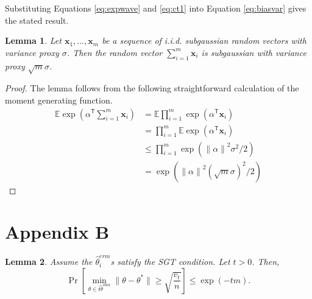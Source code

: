 \documentclass[twoside]{article}
\newtheorem{lemma}{Lemma}
\DeclareMathOperator*{\tr}{tr}
\newcommand{\Wowa}{{\hat \Theta^{\textit{owa}}}}
\newcommand{\E}{\mathbb{E}}
\newcommand{\x}{\mathbf{x}}
\newcommand{\w}{\theta}
\newcommand{\wtave}{\E\hat\w^{ave}}
\newcommand{\wmle}{\hat\w^{erm}}
\newcommand{\wstar}{{\w^{*}}}
\newcommand{\I}{\mathcal I}
\newcommand{\trans}[1]{\ensuremath{{#1}^{\mathsf{T}}}}
\newcommand{\ltwo}[1]{{\lVert {#1} \rVert}}
\newcommand{\prob}[1]{\Pr\left[{#1}\right]}
\begin{document}
Substituting Equations \ref{eq:expwave} and \ref{eq:ct1} into Equation \ref{eq:biasvar} gives the stated result.

\begin{lemma}
Let $\x_1,...,\x_m$ be a sequence of i.i.d. subgaussian random vectors with variance proxy $\sigma$.
Then the random vector $\sum_{i=1}^m \x_i$ is subgaussian with variance proxy $\sqrt{m}\sigma$.
\end{lemma}

\begin{proof}
The lemma follows from the following straightforward calculation of the moment generating function.
\begin{align}
\E{\exp(\trans\alpha\sum_{i=1}^m\x_i)}
&= \E{\prod_{i=1}^m\exp(\trans\alpha\x_i)}
\\
\label{eq:varindep}
&= \prod_{i=1}^m\E{\exp(\trans\alpha\x_i)}
\\
&\le \prod_{i=1}^m\exp(\ltwo{\alpha}^2\sigma^2/2)
\\
&= \exp(\ltwo{\alpha}^2 (\sqrt{m}\sigma)^2 /2)
\end{align}
\end{proof}


\clearpage
\section*{Appendix B}

\begin{lemma}
\label{lemma:wwstar}
Assume the $\wmle_i$s satisfy the SGT condition.
Let $t>0$. Then,
\begin{equation}
\prob{\min_{\w\in\Wowa}\ltwo{\w-\wstar} \ge \sqrt{\frac{v_t}{n}} } \le \exp(-tm)
.
\end{equation}
\end{lemma}
\end{document}
